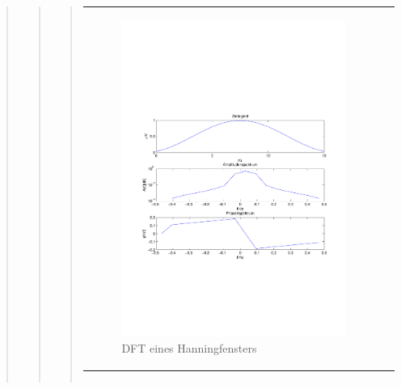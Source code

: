 \begin{quote}
\begin{quote}
\begin{quote}
\begin{center}
\begin{tabular}{ll}
\begin{minipage}{0.6\textwidth}
                        \begin{figure}[H]
                            \label{fig:}
                            \includegraphics[scale=0.5, trim = 1.5cm 7cm 1.5cm 8cm, clip]{./Bilder/HanningDFT}
                            \caption{DFT eines Hanningfensters}
                        \end{figure}
                    \vspace{-1.5em}
    
                    \end{minipage}
    
                \end{tabular}
                \end{center}
    
                \begin{center}
                \begin{tabular}{ll}
    

\end{tabular}
\end{center}
\end{quote}
\end{quote}
\end{quote}
